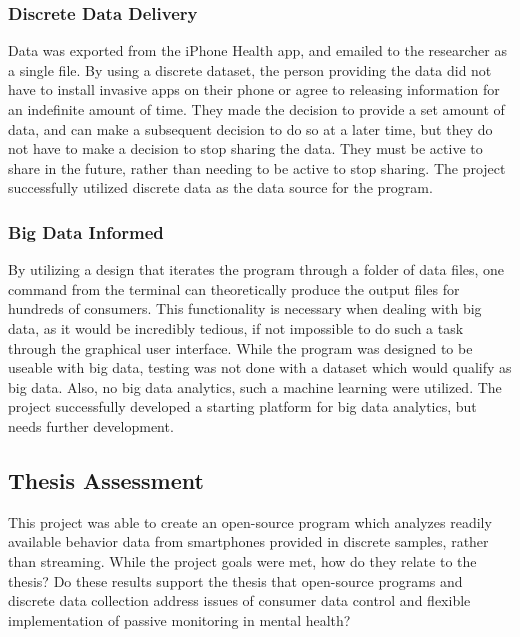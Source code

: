 \documentclass[sigconf]{acmart}
\begin{document}
\subsubsection{Discrete Data Delivery}

Data was exported from the iPhone Health app, and emailed to the researcher as a single file. By using a discrete dataset, the person providing the data did not have to install invasive apps on their phone or agree to releasing information for an indefinite amount of time. They made the decision to provide a set amount of data, and can make a subsequent decision to do so at a later time, but they do not have to make a decision to stop sharing the data. They must be active to share in the future, rather than needing to be active to stop sharing. The project successfully utilized discrete data as the data source for the program.

\subsubsection{Big Data Informed}

By utilizing a design that iterates the program through a folder of data files, one command from the terminal can theoretically produce the output files for hundreds of consumers. This functionality is necessary when dealing with big data, as it would be incredibly tedious, if not impossible to do such a task through the graphical user interface. While the program was designed to be useable with big data, testing was not done with a dataset which would qualify as big data. Also, no big data analytics, such a machine learning were utilized. The project successfully developed a starting platform for big data analytics, but needs further development.

\subsection{Thesis Assessment}

This project was able to create an open-source program which analyzes readily available behavior data from smartphones provided in discrete samples, rather than streaming. While the project goals were met, how do they relate to the thesis? Do these results support the thesis that open-source programs and discrete data collection address issues of consumer data control and flexible implementation of passive monitoring in mental health?
\end{document}

